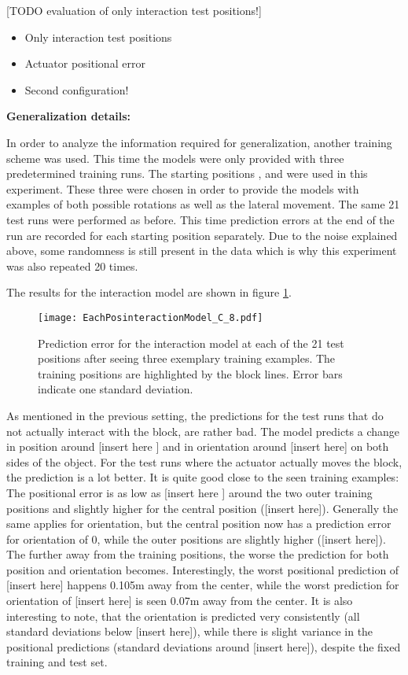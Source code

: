 [TODO evaluation of only interaction test positions!]
\begin{itemize}
\item Only interaction test positions
\item Actuator positional error
\item Second configuration!
\end{itemize}

\textbf{Generalization details:}

In order to analyze the information required for generalization, another training scheme was used. This time the models were only provided with three predetermined training runs. The starting positions ,  and  were used in this experiment. These three were chosen in order to provide the models with examples of both possible rotations as well as the lateral movement. The same 21 test runs were performed as before. This time prediction errors at the end of the run are recorded for each starting position separately. Due to the noise explained above, some randomness is still present in the data which is why this experiment was also repeated 20 times. 

The results for the interaction model are shown in figure \ref{fig:eachPosInteraction}.

\begin{figure}
\centering
\texttt{[image: EachPosinteractionModel\_C\_8.pdf]}
\caption{Prediction error for the interaction model at each of the 21 test positions after seeing three exemplary training examples. The training positions are highlighted by the block lines. Error bars indicate one standard deviation.}
\label{fig:eachPosInteraction}
\end{figure}

As mentioned in the previous setting, the predictions for the test runs that do not actually interact with the block, are rather bad. The model predicts a change in position around [insert here ] and in orientation around [insert here] on both sides of the object. 
For the test runs where the actuator actually moves the block, the prediction is a lot better. It is quite good close to the seen training examples: The positional error is as low as [insert here ] around the two outer training positions and slightly higher for the central position ([insert here]). Generally the same applies for orientation, but the central position now has a prediction error for orientation of 0, while the outer positions are slightly higher ([insert here]).
The further away from the training positions, the worse the prediction for both position and orientation becomes. Interestingly, the worst positional prediction of [insert here] happens 0.105m away from the center, while the worst prediction for orientation of [insert here] is seen 0.07m away from the center.
It is also interesting to note, that the orientation is predicted very consistently (all standard deviations below [insert here]), while there is slight variance in the positional predictions (standard deviations around [insert here]), despite the fixed training and test set.

